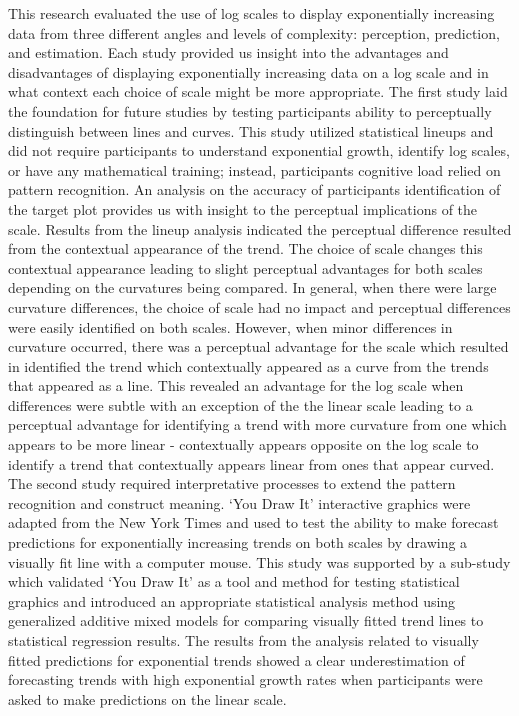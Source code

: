 \documentclass[print]{nuthesis}
\begin{document}
This research evaluated the use of log scales to display exponentially increasing data from three different angles and levels of complexity: perception, prediction, and estimation.
Each study provided us insight into the advantages and disadvantages of displaying exponentially increasing data on a log scale and in what context each choice of scale might be more appropriate.
The first study laid the foundation for future studies by testing participants ability to perceptually distinguish between lines and curves.
This study utilized statistical lineups and did not require participants to understand exponential growth, identify log scales, or have any mathematical training; instead, participants cognitive load relied on pattern recognition.
An analysis on the accuracy of participants identification of the target plot provides us with insight to the perceptual implications of the scale.
Results from the lineup analysis indicated the perceptual difference resulted from the contextual appearance of the trend.
The choice of scale changes this contextual appearance leading to slight perceptual advantages for both scales depending on the curvatures being compared.
In general, when there were large curvature differences, the choice of scale had no impact and perceptual differences were easily identified on both scales.
However, when minor differences in curvature occurred, there was a perceptual advantage for the scale which resulted in identified the trend which contextually appeared as a curve from the trends that appeared as a line.
This revealed an advantage for the log scale when differences were subtle with an exception of the the linear scale leading to a perceptual advantage for identifying a trend with more curvature from one which appears to be more linear - contextually appears opposite on the log scale to identify a trend that contextually appears linear from ones that appear curved.
The second study required interpretative processes to extend the pattern recognition and construct meaning.
`You Draw It' interactive graphics were adapted from the New York Times and used to test the ability to make forecast predictions for exponentially increasing trends on both scales by drawing a visually fit line with a computer mouse.
This study was supported by a sub-study which validated `You Draw It' as a tool and method for testing statistical graphics and introduced an appropriate statistical analysis method using generalized additive mixed models for comparing visually fitted trend lines to statistical regression results.
The results from the analysis related to visually fitted predictions for exponential trends showed a clear underestimation of forecasting trends with high exponential growth rates when participants were asked to make predictions on the linear scale.
\end{document}
